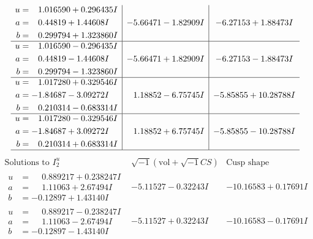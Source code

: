 \documentclass[1p]{elsarticle_modified}
\theoremstyle{definition}
\newcommand{\I}{\sqrt{-1}}
\begin{document}
$$\begin{array}{c|c|c}
\begin{aligned}
u &= \phantom{-}1.016590 + 0.296435 I \\
a &= \phantom{-}0.44819 + 1.44608 I \\
b &= \phantom{-}0.299794 + 1.323860 I\end{aligned}
 & -5.66471 - 1.82909 I & -6.27153 + 1.88473 I \\ \hline\begin{aligned}
u &= \phantom{-}1.016590 - 0.296435 I \\
a &= \phantom{-}0.44819 - 1.44608 I \\
b &= \phantom{-}0.299794 - 1.323860 I\end{aligned}
 & -5.66471 + 1.82909 I & -6.27153 - 1.88473 I \\ \hline\begin{aligned}
u &= \phantom{-}1.017280 + 0.329546 I \\
a &= -1.84687 - 3.09272 I \\
b &= \phantom{-}0.210314 - 0.683314 I\end{aligned}
 & \phantom{-}1.18852 - 6.75745 I & -5.85855 + 10.28788 I \\ \hline\begin{aligned}
u &= \phantom{-}1.017280 - 0.329546 I \\
a &= -1.84687 + 3.09272 I \\
b &= \phantom{-}0.210314 + 0.683314 I\end{aligned}
 & \phantom{-}1.18852 + 6.75745 I & -5.85855 - 10.28788 I\\
 \hline 
 \end{array}$$\newpage$$\begin{array}{c|c|c}  
\text{Solutions to }I^u_{2}& \I (\text{vol} + \sqrt{-1}CS) & \text{Cusp shape}\\
 \hline 
\begin{aligned}
u &= \phantom{-}0.889217 + 0.238247 I \\
a &= \phantom{-}1.11063 + 2.67494 I \\
b &= -0.12897 + 1.43140 I\end{aligned}
 & -5.11527 - 0.32243 I & -10.16583 + 0.17691 I \\ \hline\begin{aligned}
u &= \phantom{-}0.889217 - 0.238247 I \\
a &= \phantom{-}1.11063 - 2.67494 I \\
b &= -0.12897 - 1.43140 I\end{aligned}
 & -5.11527 + 0.32243 I & -10.16583 - 0.17691 I \\ \hline\begin{aligned}

\end{aligned}
\end{array}$$
\end{document}
